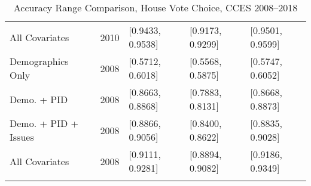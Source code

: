 \begin{longtable}{lrlll}
  All Covariates & 2010 & [0.9433, 0.9538] & [0.9173, 0.9299] & [0.9501, 0.9599] \\ 
  Demographics Only & 2008 & [0.5712, 0.6018] & [0.5568, 0.5875] & [0.5747, 0.6052] \\ 
  Demo. + PID & 2008 & [0.8663, 0.8868] & [0.7883, 0.8131] & [0.8668, 0.8873] \\ 
  Demo. + PID + Issues & 2008 & [0.8866, 0.9056] & [0.8400, 0.8622] & [0.8835, 0.9028] \\ 
  All Covariates & 2008 & [0.9111, 0.9281] & [0.8894, 0.9082] & [0.9186, 0.9349] \\ 
   \bottomrule
\caption{Accuracy Range Comparison, House Vote Choice, CCES 2008--2018} 
\label{tab:CCES_3_accuracy}
\end{longtable}
